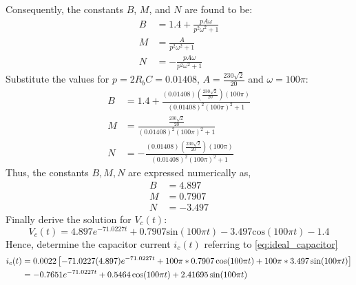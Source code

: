 Consequently, the constants $B$, $M$, and $N$ are found to be:
\begin{align}
B &= 1.4 + \frac{pA\omega}{p^2\omega^2 + 1}\\
M &= \frac{A}{p^2\omega^2 + 1}\\
N &= -\frac{pA\omega}{p^2\omega^2 + 1}
\end{align}
Substitute the values for $p=2R_bC=0.01408$, $A=\frac{230\sqrt{2}}{20}$ and $\omega=100\pi$:
\begin{align}
	B &= 1.4 + \frac{(0.01408)(\frac{230\sqrt{2}}{20})(100\pi)}{(0.01408)^2(100\pi)^2 + 1}\\
	M &= \frac{\frac{230\sqrt{2}}{20}}{(0.01408)^2(100\pi)^2 + 1}\\
	N &= -\frac{(0.01408)(\frac{230\sqrt{2}}{20})(100\pi)}{(0.01408)^2(100\pi)^2 + 1}
\end{align}
Thus, the constants $B, M, N$ are expressed numerically as,
\begin{align}
	B &= 4.897 \\
	M &= 0.7907 \\
	N &= -3.497
\end{align}
Finally derive the solution for $V_c(t)$:
\begin{equation}
	V_c(t) = 4.897e^{-71.0227t} + 0.7907\text{sin}(100\pi t) -3.497\text{cos}(100\pi t) - 1.4
	\label{eq:capacitor_voltage}
\end{equation}
Hence, determine the capacitor current $i_c(t)$ referring to \eqref{eq:ideal_capacitor}
\begin{equation}
	\begin{split}
		i_c(t) &= 0.0022\left[-71.0227(4.897)e^{-71.0227t} + 100\pi*0.7907\cos(100\pi t) + 100\pi*3.497\sin(100\pi t) \right] \\
			   &=-0.7651e^{-71.0227t} + 0.5464\cos(100\pi t) + 2.41695\sin(100\pi t)
	\end{split}
\end{equation}

